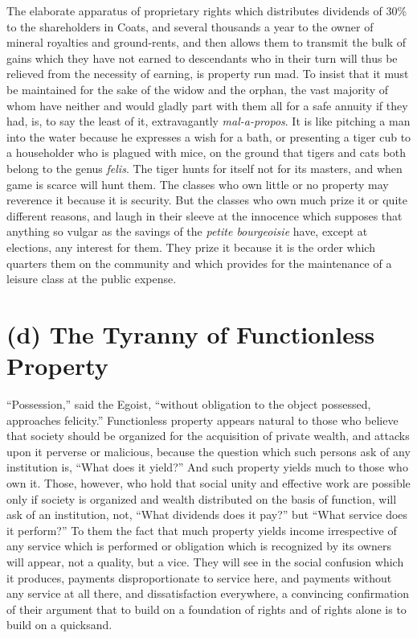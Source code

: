 \documentclass{book}
\begin{document}
The elaborate apparatus of proprietary rights which distributes dividends of 30\% to the shareholders in Coats, and several thousands a year to the owner of mineral royalties and ground-rents, and then allows them to transmit the bulk of gains which they have not earned to descendants who in their turn will thus be relieved from the necessity of earning, is property run mad. To insist that it must be maintained for the sake of the widow and the orphan, the vast majority of whom have neither and would gladly part with them all for a safe annuity if they had, is, to say the least of it, extravagantly \emph{mal-a-propos}. It is like pitching a man into the water because he expresses a wish for a bath, or presenting a tiger cub to a householder who is plagued with mice, on the ground that tigers and cats both belong to the genus \emph{felis}. The tiger hunts for itself not for its masters, and when game is scarce will hunt them. The classes who own little or no property may reverence it because it is security. But the classes who own much prize it or quite different reasons, and laugh in their sleeve at the innocence which supposes that anything so vulgar as the savings of the \emph{petite bourgeoisie} have, except at elections, any interest for them. They prize it because it is the order which quarters them on the community and which provides for the maintenance of a leisure class at the public expense.

\section{(d) The Tyranny of Functionless Property}
“Possession,” said the Egoist, “without obligation to the object possessed, approaches felicity.” Functionless property appears natural to those who believe that society should be organized for the acquisition of private wealth, and attacks upon it perverse or malicious, because the question which such persons ask of any institution is, “What does it yield?” And such property yields much to those who own it. Those, however, who hold that social unity and effective work are possible only if society is organized and wealth distributed on the basis of function, will ask of an institution, not, “What dividends does it pay?” but “What service does it perform?” To them the fact that much property yields income irrespective of any service which is performed or obligation which is recognized by its owners will appear, not a quality, but a vice. They will see in the social confusion which it produces, payments disproportionate to service here, and payments without any service at all there, and dissatisfaction everywhere, a convincing confirmation of their argument that to build on a foundation of rights and of rights alone is to build on a quicksand.
\end{document}
